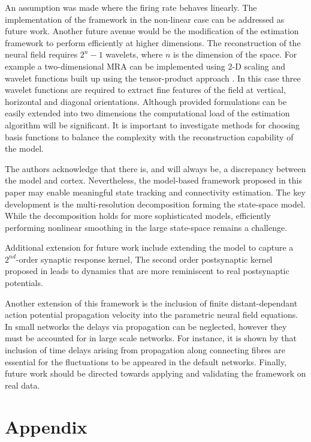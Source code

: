 \documentclass[11pt,draftcls,onecolumn,peerreview]{IEEEtran}
\begin{document}
An assumption was made where the firing rate behaves linearly. The implementation of the framework in the non-linear case can be addressed as future work. Another future avenue would be the modification of the estimation framework to perform efficiently at higher dimensions. The reconstruction of the neural field requires $2^n-1$ wavelets, where $n$ is the dimension of the space. For example a two-dimensional MRA can be implemented using 2-D scaling and wavelet functions built up using the tensor-product approach \cite{Meyer1992}. In this case three wavelet functions are required to  extract fine features of the field at vertical, horizontal and diagonal orientations. Although provided formulations can be easily extended into two dimensions the  computational load of the estimation algorithm will be significant. It is important to investigate methods for choosing basis functions to balance the complexity with the reconstruction capability of the model.
 
The authors acknowledge that there is, and will always be, a discrepancy between the model and cortex. Nevertheless, the model-based framework proposed in this paper may enable meaningful state tracking and connectivity estimation. The key development is the multi-resolution decomposition forming the state-space model. While the decomposition holds for more sophisticated models, efficiently performing nonlinear smoothing in the large state-space remains a challenge. 

Additional extension for future work include extending the model to capture a $2^{nd}$-order synaptic response kernel, The second order postsynaptic kernel proposed in \cite{VanRotterdam1982} leads to dynamics that are more reminiscent to real postsynaptic potentials. 

Another extension of this framework is the inclusion of finite distant-dependant action potential propagation velocity into the parametric neural field equations. In small networks the delays via propagation can be neglected, however they must be accounted for in large scale networks. For instance, it is shown by \cite{Ghosh2008} that inclusion of time delays arising from propagation along connecting fibres are essential for the fluctuations to be appeared in the default networks. Finally, future work should be directed towards applying and validating the framework on real data.
\section{Appendix}
\end{document}
